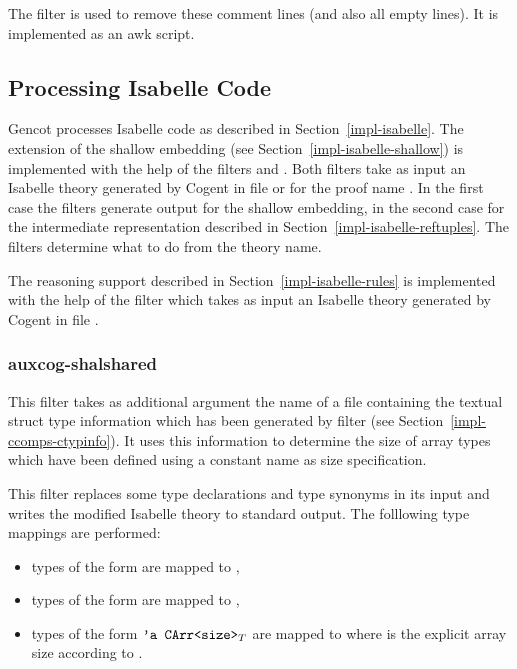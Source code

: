 The filter  is used to remove these comment lines (and also all empty lines). It is implemented
as an awk script.

\subsection{Processing Isabelle Code}
\label{impl-ocomps-isabelle}

Gencot processes Isabelle code as described in Section~\ref{impl-isabelle}. The extension of the shallow embedding
(see Section~\ref{impl-isabelle-shallow}) is implemented with the help of the filters  and
. Both filters take as input an Isabelle theory generated by Cogent in file
 or  for the proof name . In the first case
the filters generate output for the shallow embedding, in the second case for the intermediate representation
described in Section~\ref{impl-isabelle-reftuples}. The filters determine what to do from the theory name.

The reasoning support described in Section~\ref{impl-isabelle-rules} is implemented with the help of the filter
 which takes as input an Isabelle theory generated by Cogent in file
.

\subsubsection{auxcog-shalshared}

This filter takes as additional argument the name of a file containing the textual struct type information which 
has been generated by filter  (see Section~\ref{impl-ccomps-ctypinfo}). It uses this 
information to determine the size of array types which have been defined using a constant name as size specification.

This filter replaces some type declarations and type synonyms in its input and writes the modified Isabelle theory
to standard output. The folllowing type mappings are performed:
\begin{itemize}
\item types of the form  are mapped to ,
\item types of the form  are mapped to ,
\item types of the form $\textnormal{\texttt{'a CArr<size>}}_T$ are mapped to  where 
 is the explicit array size according to .
\end{itemize}

